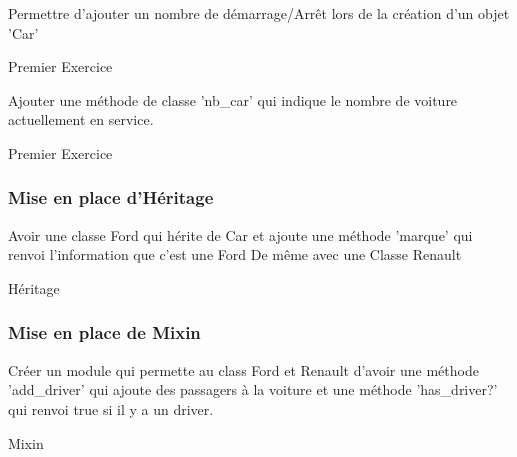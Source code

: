 \documentclass{beamer}
\begin{document}
\begin{frame}
  Permettre d'ajouter un nombre de d\'emarrage/Arrêt lors de la cr\'eation
  d'un objet 'Car'
\end{frame}
\begin{frame}
  \begin{beamerboxesrounded}{Premier Exercice}
    
  \end{beamerboxesrounded}
\end{frame}

\begin{frame}
  Ajouter une m\'ethode de classe 'nb\_car' qui indique le nombre de voiture actuellement en
  service.
\end{frame}
\begin{frame}
  \begin{beamerboxesrounded}{Premier Exercice}
    
  \end{beamerboxesrounded}
\end{frame}


\begin{frame}
  \frametitle{Mise en place d'H\'eritage}
  Avoir une classe Ford qui h\'erite de Car et ajoute une m\'ethode 'marque' qui renvoi l'information que c'est une Ford
  De même avec une Classe Renault
\end{frame}

\begin{frame}
  \begin{beamerboxesrounded}{H\'eritage}
    
  \end{beamerboxesrounded}
\end{frame}

\begin{frame}
  \frametitle{Mise en place de Mixin}
  Cr\'eer un module qui permette au class Ford et Renault d'avoir une m\'ethode 'add\_driver'
  qui ajoute des passagers à la voiture et une m\'ethode 'has\_driver?' qui renvoi true si il y a un driver.
\end{frame}
\begin{frame}
  \begin{beamerboxesrounded}{Mixin}
    
  \end{beamerboxesrounded}
\end{frame}
\end{document}
